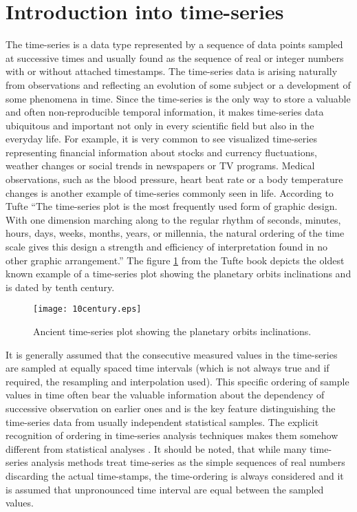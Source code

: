 \section{Introduction into time-series}
The time-series is a data type represented by a sequence of data points sampled at successive times and usually found as the sequence of real or integer numbers with or without attached timestamps. The time-series data is arising naturally from observations and reflecting an evolution of some subject or a development of some phenomena in time. Since the time-series is the only way to store a valuable and often non-reproducible temporal information, it makes time-series data ubiquitous and important not only in every scientific field but also in the everyday life. For example, it is very common to see visualized time-series representing financial information about stocks and currency fluctuations, weather changes or social trends in newspapers or TV programs. Medical observations, such as the blood pressure, heart beat rate or a body temperature changes is another example of time-series commonly seen in life. According to Tufte \cite{citeulike:1454223} ``The time-series plot is the most frequently used form of graphic design. With one dimension marching along to the regular rhythm of seconds, minutes, hours, days, weeks, months, years, or millennia, the natural ordering of the time scale gives this design a strength and efficiency of interpretation found in no other graphic arrangement.'' The figure \ref{fig:10century} from the Tufte book depicts the oldest known example of a time-series plot showing the planetary orbits inclinations and is dated by tenth century.
\begin{figure}[tbp]
   \centering
   \texttt{[image: 10century.eps]}
   \caption{Ancient time-series plot showing the planetary orbits inclinations.}
   \label{fig:10century}
\end{figure} 

It is generally assumed that the consecutive measured values in the time-series are sampled at equally spaced time intervals (which is not always true and if required, the resampling and interpolation used). This specific ordering of sample values in time often bear the valuable information about the dependency of successive observation on earlier ones and is the key feature distinguishing the time-series data from usually independent statistical samples. 
The explicit recognition of ordering in time-series analysis techniques makes them somehow different from statistical analyses \cite{citeulike:3989988}. It should be noted, that while many time-series analysis methods treat time-series as the simple sequences of real numbers discarding the actual time-stamps, the time-ordering is always considered and it is assumed that unpronounced time interval are equal between the sampled values.

